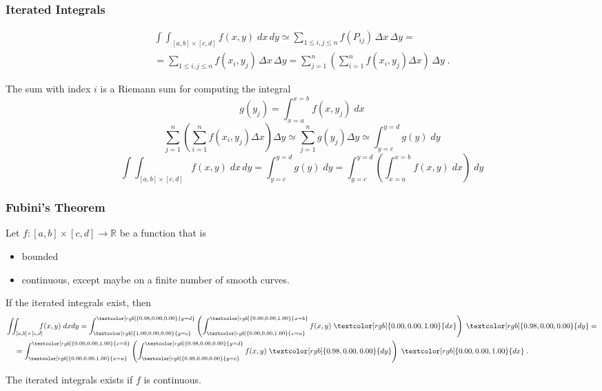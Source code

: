 \begin{frame}
  \frametitle{Iterated Integrals}
%
\begin{align*}
  \int\!\!\!\int_{[a,b] \times [c,d]} f(x,y) \; dx\, dy \simeq \sum_{1\leqslant i,j \leqslant n} f(P_{ij}) \, \Delta x \, \Delta y = \\
  = \sum_{1\leqslant i,j \leqslant n} f(x_i,y_j) \, \Delta x\, \Delta y = \sum_{j=1}^n \left( \sum_{i=1}^n f(x_i,y_j) \Delta x \right)\, \Delta y\; .
\end{align*}

\pause
The sum with index $i$ is a Riemann sum for computing the integral
%
$$g(y_j) = \int_{x=a}^{x=b} f(x,y_j) \; dx$$
%
\pause
$$\sum_{j=1}^n\left( \sum_{i=1}^n f(x_i,y_j) \Delta x \right) \Delta y \simeq \sum_{j=1}^n g(y_j) \Delta y \simeq \int_{y=c}^{y=d} g(y) \; dy$$
%
\pause
$$\int\!\!\!\int_{[a,b] \times [c,d]} f(x,y) \; dx\, dy = \int_{y=c}^{y=d} g(y) \; dy = \int_{y=c}^{y=d} \left( \int_{x=a}^{x=b} f(x,y) \; dx \right) \; dy$$
%
\end{frame}

\begin{frame}
    \frametitle{Fubini's Theorem}
Let $f \colon [a,b]\times[c,d] \to \mathbb{R}$ be a function that is
\begin{itemize}
  \item bounded
  \item continuous, except maybe on a finite number of smooth curves.
\end{itemize}
If the iterated integrals exist, then
%
\begin{align*}
  \int&\!\!\!\int_{[a,b]\times [c,d]}\!\!\!\! f(x,y) \; dxdy = \int_{\textcolor[rgb]{1.00,0.00,0.00}{y=c}}^{\textcolor[rgb]{0.98,0.00,0.00}{y=d}} \left( \int_{\textcolor[rgb]{0.00,0.00,1.00}{x=a}}^{\textcolor[rgb]{0.00,0.00,1.00}{x=b}} f(x,y) \; \textcolor[rgb]{0.00,0.00,1.00}{dx} \right) \; \textcolor[rgb]{0.98,0.00,0.00}{dy} = \\
  & = \int_{\textcolor[rgb]{0.00,0.00,1.00}{x=a}}^{\textcolor[rgb]{0.00,0.00,1.00}{x=b}} \left( \int_{\textcolor[rgb]{0.98,0.00,0.00}{y=c}}^{\textcolor[rgb]{0.98,0.00,0.00}{y=d}} f(x,y) \; \textcolor[rgb]{0.98,0.00,0.00}{dy} \right) \; \textcolor[rgb]{0.00,0.00,1.00}{dx}\; .
\end{align*}

The iterated integrals exists if $f$ is continuous.
\end{frame}

